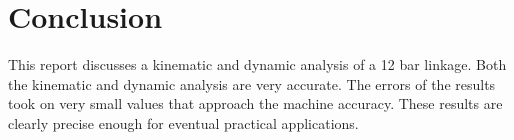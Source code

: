 \documentclass[a4paper]{article}
\begin{document}
\section*{Conclusion}

This report discusses a kinematic and dynamic analysis of a 12 bar linkage. Both the kinematic and dynamic analysis are very accurate. The errors of the results took on very small values that approach the machine accuracy. These results are clearly precise enough for eventual practical applications.



\end{document}
